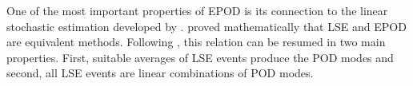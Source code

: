 One of the most important properties of EPOD is its connection to the linear stochastic estimation developed by \citep{adrian1979conditional}.
\citet{boree2003extended} proved mathematically that LSE and EPOD are equivalent methods.
Following \citet{holmes2012turbulence}, this relation can be resumed in two main properties.
First, suitable averages of LSE events produce the POD modes and second, all LSE events are linear combinations of POD modes.

